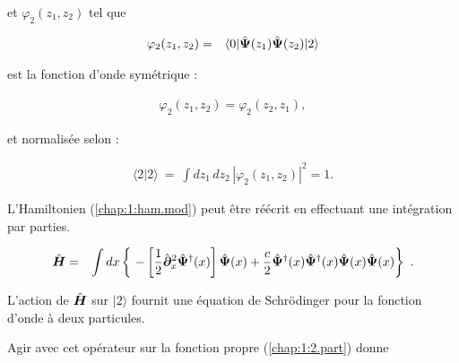et \(\varphi_2(z_1, z_2)\) tel que 

\begin{eqnarray}
	\varphi_2(z_1, z_2) & = & 	\langle 0 \vert  \hat{\bm{\Psi}}(z_1) \hat{\bm{\Psi}}(z_2)\vert  2  \rangle 
\end{eqnarray}


est la fonction d’onde symétrique :

\begin{eqnarray}
	\varphi_2(z_1, z_2) = \varphi_2(z_2, z_1),
\end{eqnarray}

et normalisée selon :

\begin{eqnarray}
	\langle 2 \vert 2 \rangle ~=~ \int dz_1\, dz_2\, |\varphi_2(z_1, z_2)|^2 = 1.
\end{eqnarray}

L'Hamiltonien (\ref{chap:1:ham.mod}) peut être réécrit en effectuant une intégration par parties. 

\begin{eqnarray}
	\operator{H} & = & \int dx \left \{ -\left [\frac{1}{2}\operator{\partial}_x^2 \operator{\Psi}^\dag(x)\right ] \operator{\Psi}(x) + \frac{c}{2} \operator{\Psi}^\dag (x) \operator{\Psi}^\dag (x) \operator{\Psi} (x) \operator{\Psi} (x) \right \} \label{chap:1:ham.mod.2}.
\end{eqnarray}

L’action de \(\hat{\bm{H}}\) sur \(\vert 2 \rangle\) fournit une équation de Schrödinger pour la fonction d’onde à deux particules. 

Agir avec cet opérateur sur la fonction propre (\ref{chap:1:2.part}) donne 

